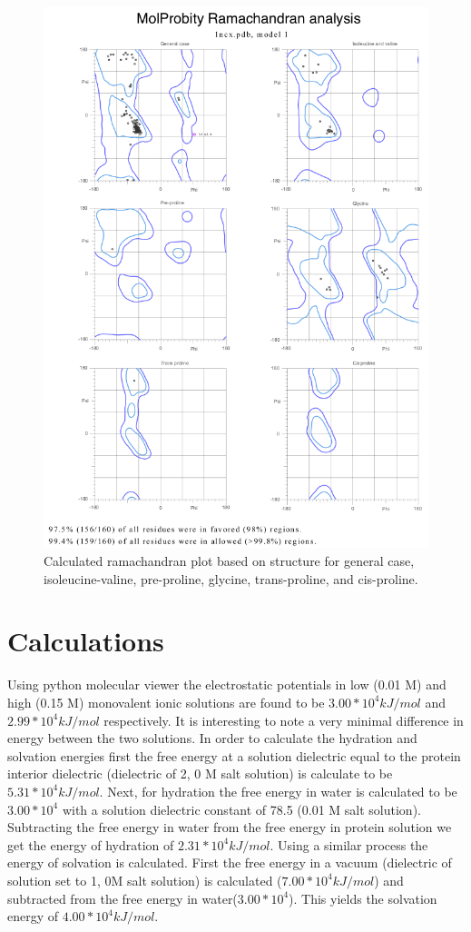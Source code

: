 \documentclass[12pt]{article}
\begin{document}
	
	\begin{figure}[h]
		\centering
		\includegraphics[width=.75\linewidth]{ramachandran.png}
		
		\caption{Calculated ramachandran plot based on structure for general case, isoleucine-valine, pre-proline, glycine, trans-proline, and cis-proline.}
		\label{ramchan}
	\end{figure}
	\section{Calculations}
	
	Using python molecular viewer the electrostatic potentials in low (0.01 M) and high (0.15 M) monovalent ionic solutions are found to be $3.00*10^4 kJ/mol$ and $2.99*10^4 kJ/mol$ respectively. It is interesting to note a very minimal difference in energy between the two solutions. In order to calculate the hydration and solvation energies first the free energy at a solution dielectric equal to the protein interior dielectric (dielectric of 2, 0 M salt solution) is calculate to be $5.31 *10^4 kJ/mol$. Next, for hydration the free energy in water is calculated to be $3.00*10^4$ with a solution dielectric constant of 78.5 (0.01 M salt solution). Subtracting the free energy in water from the free energy in protein solution we get the energy of hydration of $2.31*10^4 kJ/mol$. Using a similar process the energy of solvation is calculated. First the free energy in a vacuum (dielectric of solution set to 1, 0M salt solution) is calculated ($7.00*10^4kJ/mol$) and subtracted from the free energy in water($3.00*10^4$). This yields the solvation energy of $4.00*10^4kJ/mol$.
	
\end{document}
